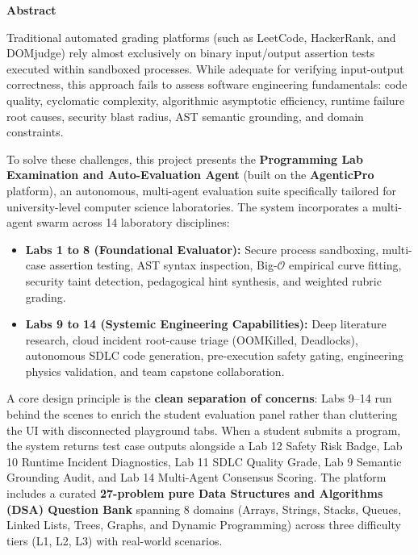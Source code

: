\documentclass[12pt, a4paper]{report}
\begin{document}
\newpage
{}
\setcounter{page}{4}

\begin{center}
{\LARGE\bfseries Abstract\par}
\end{center}
\vspace{0.5cm}

\noindent Traditional automated grading platforms (such as LeetCode, HackerRank, and DOMjudge) rely almost exclusively on binary input/output assertion tests executed within sandboxed processes. While adequate for verifying input-output correctness, this approach fails to assess software engineering fundamentals: code quality, cyclomatic complexity, algorithmic asymptotic efficiency, runtime failure root causes, security blast radius, AST semantic grounding, and domain constraints.

\vspace{0.3cm}
\noindent To solve these challenges, this project presents the \textbf{Programming Lab Examination and Auto-Evaluation Agent} (built on the \textbf{AgenticPro} platform), an autonomous, multi-agent evaluation suite specifically tailored for university-level computer science laboratories. The system incorporates a multi-agent swarm across 14 laboratory disciplines:
\begin{itemize}[itemsep=2pt,leftmargin=1.5em]
    \item \textbf{Labs 1 to 8 (Foundational Evaluator):} Secure process sandboxing, multi-case assertion testing, AST syntax inspection, Big-$\mathcal{O}$ empirical curve fitting, security taint detection, pedagogical hint synthesis, and weighted rubric grading.
    \item \textbf{Labs 9 to 14 (Systemic Engineering Capabilities):} Deep literature research, cloud incident root-cause triage (OOMKilled, Deadlocks), autonomous SDLC code generation, pre-execution safety gating, engineering physics validation, and team capstone collaboration.
\end{itemize}

\vspace{0.3cm}
\noindent A core design principle is the \textbf{clean separation of concerns}: Labs 9--14 run behind the scenes to enrich the student evaluation panel rather than cluttering the UI with disconnected playground tabs. When a student submits a program, the system returns test case outputs alongside a Lab 12 Safety Risk Badge, Lab 10 Runtime Incident Diagnostics, Lab 11 SDLC Quality Grade, Lab 9 Semantic Grounding Audit, and Lab 14 Multi-Agent Consensus Scoring. The platform includes a curated \textbf{27-problem pure Data Structures and Algorithms (DSA) Question Bank} spanning 8 domains (Arrays, Strings, Stacks, Queues, Linked Lists, Trees, Graphs, and Dynamic Programming) across three difficulty tiers (L1, L2, L3) with real-world scenarios.
\end{document}
